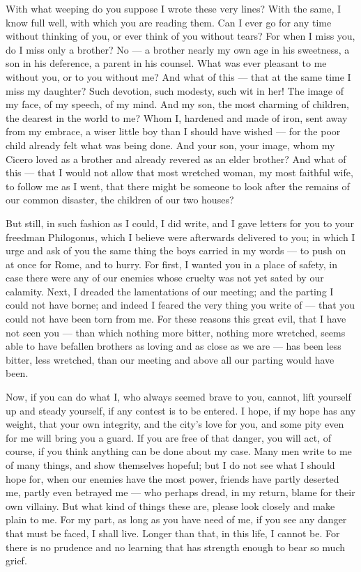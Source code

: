  With what weeping do you suppose I wrote these very lines? With the same, I know full well, with which you are reading them. Can I ever go for any time without thinking of you, or ever think of you without tears? For when I miss you, do I miss only a brother? No --- a brother nearly my own age in his sweetness, a son in his deference, a parent in his counsel. What was ever pleasant to me without you, or to you without me? And what of this --- that at the same time I miss my daughter? Such devotion, such modesty, such wit in her! The image of my face, of my speech, of my mind. And my son, the most charming of children, the dearest in the world to me? Whom I, hardened and made of iron, sent away from my embrace, a wiser little boy than I should have wished --- for the poor child already felt what was being done. And your son, your image, whom my Cicero loved as a brother and already revered as an elder brother? And what of this --- that I would not allow that most wretched woman, my most faithful wife, to follow me as I went, that there might be someone to look after the remains of our common disaster, the children of our two houses?

 But still, in such fashion as I could, I did write, and I gave letters for you to your freedman Philogonus, which I believe were afterwards delivered to you; in which I urge and ask of you the same thing the boys carried in my words --- to push on at once for Rome, and to hurry. For first, I wanted you in a place of safety, in case there were any of our enemies whose cruelty was not yet sated by our calamity. Next, I dreaded the lamentations of our meeting; and the parting I could not have borne; and indeed I feared the very thing you write of --- that you could not have been torn from me. For these reasons this great evil, that I have not seen you --- than which nothing more bitter, nothing more wretched, seems able to have befallen brothers as loving and as close as we are --- has been less bitter, less wretched, than our meeting and above all our parting would have been.

 Now, if you can do what I, who always seemed brave to you, cannot, lift yourself up and steady yourself, if any contest is to be entered. I hope, if my hope has any weight, that your own integrity, and the city's love for you, and some pity even for me will bring you a guard. If you are free of that danger, you will act, of course, if you think anything can be done about my case. Many men write to me of many things, and show themselves hopeful; but I do not see what I should hope for, when our enemies have the most power, friends have partly deserted me, partly even betrayed me --- who perhaps dread, in my return, blame for their own villainy. But what kind of things these are, please look closely and make plain to me. For my part, as long as you have need of me, if you see any danger that must be faced, I shall live. Longer than that, in this life, I cannot be. For there is no prudence and no learning that has strength enough to bear so much grief.


